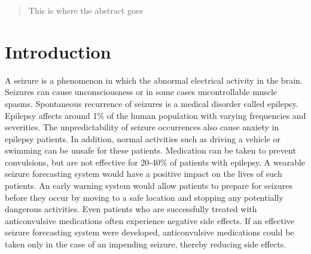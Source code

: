 \documentclass[10pt, conference, compsocconf]{IEEEtran}
\begin{document}




\maketitle


\begin{abstract}
This is where the abstract goes
\end{abstract}



%
\IEEEpeerreviewmaketitle





\section{Introduction} 
A seizure is a phenomenon in which the abnormal electrical activity in the
brain. Seizures can cause unconsciousness or in some cases uncontrollable muscle
spasms. Spontaneous recurrence of seizures is a medical disorder called
epilepsy. Epilepsy affects around 1\% of the human population with varying
frequencies and severities. The unpredictability of seizure occurrences also
cause anxiety in epilepsy patients. In addition, normal activities such as
driving a vehicle or swimming can be unsafe for these patients. Medication can
be taken to prevent convulsions, but are not effective for 20-40\% of patients
with epilepsy. A wearable seizure forecasting system would have a positive
impact on the lives of such patients. An early warning system would allow
patients to prepare for seizures before they occur by moving to a safe location
and stopping any potentially dangerous activities. Even patients who are
successfully treated with anticonvulsive medications often experience negative
side effects. If an effective seizure forecasting system were developed,
anticonvulsive medications could be taken only in the case of an impending
seizure, thereby reducing side effects.
\end{document}
